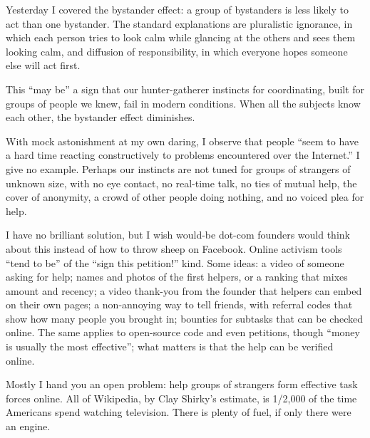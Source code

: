 
Yesterday I covered the bystander effect: a group of bystanders is less likely to act than one bystander. The standard explanations are pluralistic ignorance, in which each person tries to look calm while glancing at the others and sees them looking calm, and diffusion of responsibility, in which everyone hopes someone else will act first.

This ``may be'' a sign that our hunter-gatherer instincts for coordinating, built for groups of people we knew, fail in modern conditions. When all the subjects know each other, the bystander effect diminishes. 

With mock astonishment at my own daring, I observe that people ``seem to have a hard time reacting constructively to problems encountered over the Internet.'' I give no example. Perhaps our instincts are not tuned for groups of strangers of unknown size, with no eye contact, no real-time talk, no ties of mutual help, the cover of anonymity, a crowd of other people doing nothing, and no voiced plea for help. 

I have no brilliant solution, but I wish would-be dot-com founders would think about this instead of how to throw sheep on Facebook. Online activism tools ``tend to be'' of the ``sign this petition!'' kind.  Some ideas: a video of someone asking for help; names and photos of the first helpers, or a ranking that mixes amount and recency; a video thank-you from the founder that helpers can embed on their own pages; a non-annoying way to tell friends, with referral codes that show how many people you brought in; bounties for subtasks that can be checked online. The same applies to open-source code and even petitions, though ``money is usually the most effective''; what matters is that the help can be verified online. 

Mostly I hand you an open problem: help groups of strangers form effective task forces online. All of Wikipedia, by Clay Shirky's estimate, is 1/2,000 of the time Americans spend watching television.  There is plenty of fuel, if only there were an engine.
